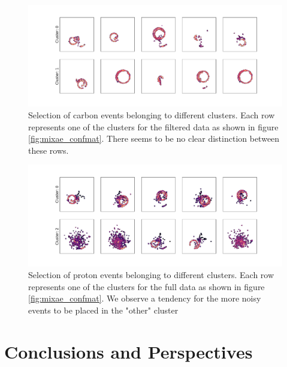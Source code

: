 \documentclass[preprint,12pt]{elsarticle}
\begin{document}
\begin{figure}
\centering
\includegraphics[width=\textwidth]{plots/clean_cluster_repr.pdf}
\caption[Selection of carbon events in differing clusters]{Selection of carbon events belonging to different clusters. Each row represents one of the clusters for the filtered data as shown in figure \ref{fig:mixae_confmat}. There seems to be no clear distinction between these rows.}\label{fig:filtered_mixae_clster_repr}	
\end{figure} 

\begin{figure}
\centering
\includegraphics[width=\textwidth]{plots/real_cluster_repr.pdf}	
\caption[Selection of proton events in differing clusters]{Selection of proton events belonging to different clusters. Each row represents one of the clusters for the full data as shown in figure \ref{fig:mixae_confmat}. We observe a tendency for the more noisy events to be placed in the "other" cluster}\label{fig:full_mixae_clster_repr}	
\end{figure} 

\section{Conclusions and Perspectives}\label{sec{conclusion}}

\appendix  
\end{document}
